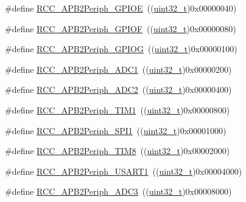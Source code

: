 \begin{DoxyCompactItemize}
\item 
\#define \hyperlink{group___a_p_b2__peripheral_gabc736c9892278ccd15848c6137d991fc}{R\+C\+C\+\_\+\+A\+P\+B2\+Periph\+\_\+\+G\+P\+I\+OE}~((\hyperlink{_p_e___types_8h_a33594304e786b158f3fb30289278f5af}{uint32\+\_\+t})0x00000040)
\item 
\#define \hyperlink{group___a_p_b2__peripheral_ga2dbb1e1116b57621c585e1b52c894bda}{R\+C\+C\+\_\+\+A\+P\+B2\+Periph\+\_\+\+G\+P\+I\+OF}~((\hyperlink{_p_e___types_8h_a33594304e786b158f3fb30289278f5af}{uint32\+\_\+t})0x00000080)
\item 
\#define \hyperlink{group___a_p_b2__peripheral_gaba82756d2060b97c62eb555242361b2e}{R\+C\+C\+\_\+\+A\+P\+B2\+Periph\+\_\+\+G\+P\+I\+OG}~((\hyperlink{_p_e___types_8h_a33594304e786b158f3fb30289278f5af}{uint32\+\_\+t})0x00000100)
\item 
\#define \hyperlink{group___a_p_b2__peripheral_gacd24acb2cd5ca208652157f6c13d3145}{R\+C\+C\+\_\+\+A\+P\+B2\+Periph\+\_\+\+A\+D\+C1}~((\hyperlink{_p_e___types_8h_a33594304e786b158f3fb30289278f5af}{uint32\+\_\+t})0x00000200)
\item 
\#define \hyperlink{group___a_p_b2__peripheral_ga4fd76e573e827702568d6064e33448b5}{R\+C\+C\+\_\+\+A\+P\+B2\+Periph\+\_\+\+A\+D\+C2}~((\hyperlink{_p_e___types_8h_a33594304e786b158f3fb30289278f5af}{uint32\+\_\+t})0x00000400)
\item 
\#define \hyperlink{group___a_p_b2__peripheral_ga0d9babf212897db0b3aa852f8a71160b}{R\+C\+C\+\_\+\+A\+P\+B2\+Periph\+\_\+\+T\+I\+M1}~((\hyperlink{_p_e___types_8h_a33594304e786b158f3fb30289278f5af}{uint32\+\_\+t})0x00000800)
\item 
\#define \hyperlink{group___a_p_b2__peripheral_ga289cc086580f4b6a080ea0ed3dd4a7af}{R\+C\+C\+\_\+\+A\+P\+B2\+Periph\+\_\+\+S\+P\+I1}~((\hyperlink{_p_e___types_8h_a33594304e786b158f3fb30289278f5af}{uint32\+\_\+t})0x00001000)
\item 
\#define \hyperlink{group___a_p_b2__peripheral_gac951d41a08140a7d38a4faff8dd1e03e}{R\+C\+C\+\_\+\+A\+P\+B2\+Periph\+\_\+\+T\+I\+M8}~((\hyperlink{_p_e___types_8h_a33594304e786b158f3fb30289278f5af}{uint32\+\_\+t})0x00002000)
\item 
\#define \hyperlink{group___a_p_b2__peripheral_ga14e1b3b6d84801c223a37a954b5b1910}{R\+C\+C\+\_\+\+A\+P\+B2\+Periph\+\_\+\+U\+S\+A\+R\+T1}~((\hyperlink{_p_e___types_8h_a33594304e786b158f3fb30289278f5af}{uint32\+\_\+t})0x00004000)
\item 
\#define \hyperlink{group___a_p_b2__peripheral_ga371d55bbf17bf965a213c59f2d276d72}{R\+C\+C\+\_\+\+A\+P\+B2\+Periph\+\_\+\+A\+D\+C3}~((\hyperlink{_p_e___types_8h_a33594304e786b158f3fb30289278f5af}{uint32\+\_\+t})0x00008000)

\end{DoxyCompactItemize}

